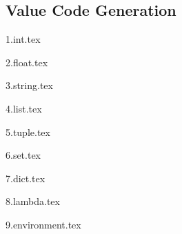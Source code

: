 
\subsection{Value Code Generation}
{
	\lipsum[1]
	
	{1.int.tex}
	
	{2.float.tex}
	
	{3.string.tex}
	
	{4.list.tex}
	
	{5.tuple.tex}
	
	{6.set.tex}
	
	{7.dict.tex}
	
	{8.lambda.tex}
	
	{9.environment.tex}
}
